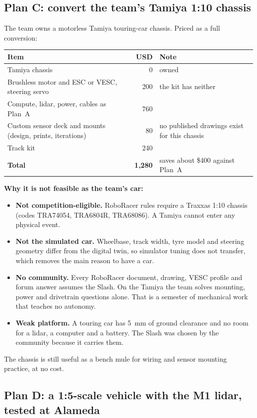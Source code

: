\documentclass[11pt,a4paper]{article}
\begin{document}
\subsection{Plan C: convert the team's Tamiya 1:10 chassis}
\label{sec:tamiya}

The team owns a motorless Tamiya touring-car chassis. Priced as a full conversion:

\begin{tabularx}{\linewidth}{p{6.2cm}rX}
\toprule
Item & USD & Note \\
\midrule
Tamiya chassis & 0 & owned \\
Brushless motor and ESC or VESC, steering servo & 200 & the kit has neither \\
Compute, lidar, power, cables as Plan~A & 760 & \\
Custom sensor deck and mounts (design, prints, iterations) & 80 & no published drawings exist for this chassis \\
Track kit & 240 & \\
\midrule
\textbf{Total} & \textbf{1{,}280} & saves about \$400 against Plan~A \\
\bottomrule
\end{tabularx}

\medskip
\textbf{Why it is not feasible as the team's car:}
\begin{itemize}
  \item \textbf{Not competition-eligible.} RoboRacer rules require a Traxxas 1:10 chassis (codes TRA74054, TRA6804R, TRA68086). A Tamiya cannot enter any physical event.
  \item \textbf{Not the simulated car.} Wheelbase, track width, tyre model and steering geometry differ from the digital twin, so simulator tuning does not transfer, which removes the main reason to have a car.
  \item \textbf{No community.} Every RoboRacer document, drawing, VESC profile and forum answer assumes the Slash. On the Tamiya the team solves mounting, power and drivetrain questions alone. That is a semester of mechanical work that teaches no autonomy.
  \item \textbf{Weak platform.} A touring car has 5~mm of ground clearance and no room for a lidar, a computer and a battery. The Slash was chosen by the community because it carries them.
\end{itemize}
The chassis is still useful as a bench mule for wiring and sensor mounting practice, at no cost.

\subsection{Plan D: a 1:5-scale vehicle with the M1 lidar, tested at Alameda}
\label{sec:large}
\end{document}
